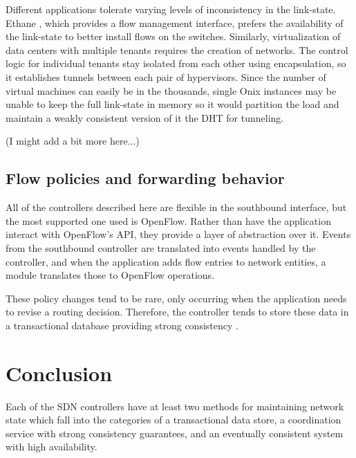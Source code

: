 \documentclass[letterpaper,twocolumn,10pt]{article}
\begin{document}
Different applications tolerate varying levels of inconsistency in the link-state. Ethane \cite{koponen2010onix}, which provides a flow management interface, prefers the availability of the link-state to better install flows on the switches. Similarly, virtualization of data centers with multiple tenants requires the creation of networks. The control logic for individual tenants stay isolated from each other using encapsulation, so it establishes tunnels between each pair of hypervisors. Since the number of virtual machines can easily be in the thousands, single Onix instances may be unable to keep the full link-state in memory so it would partition the load and maintain a weakly consistent version of it the DHT for tunneling.

(I might add a bit more here...)

\subsection*{Flow policies and forwarding behavior}

All of the controllers described here are flexible in the southbound interface, but the most supported one used is OpenFlow. Rather than have the application interact with OpenFlow's API, they provide a layer of abstraction over it. Events from the southbound controller are translated into events handled by the controller, and when the application adds flow entries to network entities, a module translates those to OpenFlow operations. 

These policy changes tend to be rare, only occurring when the application needs to revise a routing decision. Therefore, the controller tends to store these data in a transactional database providing strong consistency \cite{koponen2010onix}.


\section{Conclusion}

Each of the SDN controllers have at least two methods for maintaining network state which fall into the categories of a transactional data store, a coordination service with strong consistency guarantees, and an eventually consistent system with high availability. 
\end{document}
